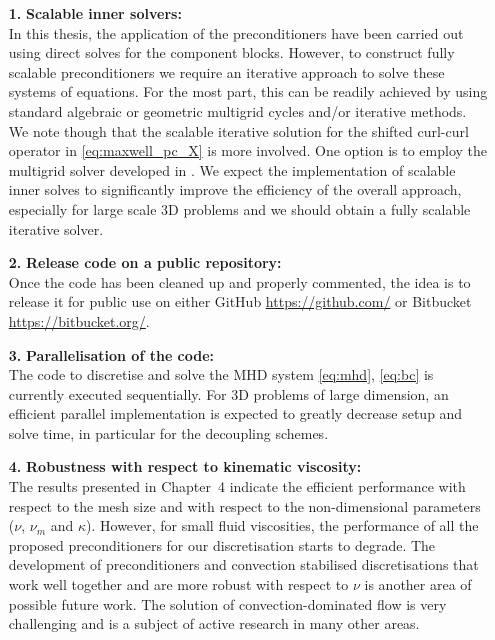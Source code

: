 \begin{itemize}
    \item[\textbf{1.}] \textbf{Scalable inner solvers:} ~\\ In this thesis, the application of the preconditioners have been carried out using direct solves for the component blocks. However, to construct fully scalable preconditioners we require an iterative approach to solve these systems of equations. For the most part, this can be readily achieved by using standard algebraic or geometric multigrid cycles and/or iterative methods. We note though that the scalable iterative solution for the shifted curl-curl operator in \eqref{eq:maxwell_pc_X} is more involved. One option is to employ the multigrid solver developed in \cite{hiptmair2007nodal}. We expect the  implementation of scalable inner solves to significantly improve the efficiency of the overall approach, especially for large scale 3D problems and we should obtain a fully scalable iterative solver.
    \item[\textbf{2.}] \textbf{Release code on a public repository:} ~\\ Once the code has been cleaned up and properly commented, the idea is to release  it for public use on either GitHub \url{https://github.com/} or Bitbucket \url{https://bitbucket.org/}.
    \item[\textbf{3.}] \textbf{Parallelisation of the code:} ~\\ The code to discretise and solve the MHD system \eqref{eq:mhd}, \eqref{eq:bc} is currently executed sequentially. For 3D problems of large dimension, an efficient parallel implementation is expected to greatly decrease setup and solve time, in particular for the decoupling schemes.
    \item[\textbf{4.}] \textbf{Robustness with respect to kinematic viscosity:} ~\\ The results presented in Chapter~4 indicate the  efficient performance with respect to the mesh size and with respect to the non-dimensional parameters ($\nu$, $\nu_m$ and $\kappa$). However, for small fluid viscosities, the performance of all the proposed  preconditioners for our  discretisation starts to degrade. The development of preconditioners and convection stabilised discretisations that work well together and are more robust with respect to $\nu$ is another area of possible future work. The solution of convection-dominated flow is very challenging and is a subject of active research in many other areas.

\end{itemize}
